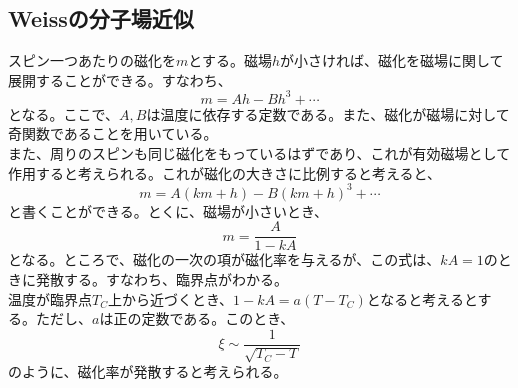 \documentclass[a4paper,11pt]{jsarticle}
\numberwithin{equation}{section}
\begin{document}
\subsection{Weissの分子場近似}
スピン一つあたりの磁化を$m$とする。磁場$h$が小さければ、磁化を磁場に関して展開することができる。すなわち、
\begin{equation}
    m = Ah -Bh^3 + \cdots
\end{equation}
となる。ここで、$A,B$は温度に依存する定数である。また、磁化が磁場に対して奇関数であることを用いている。\\
また、周りのスピンも同じ磁化をもっているはずであり、これが有効磁場として作用すると考えられる。これが磁化の大きさに比例すると考えると、
\begin{equation}
    m = A(km+h) - B(km+h)^3 + \cdots
\end{equation}
と書くことができる。とくに、磁場が小さいとき、
\begin{equation}
    m = \frac{A}{1-kA}
\end{equation}
となる。ところで、磁化の一次の項が磁化率を与えるが、この式は、$kA =1$のときに発散する。すなわち、臨界点がわかる。\\
温度が臨界点$T_C$上から近づくとき、$1-kA = a(T-T_C)$となると考えるとする。ただし、$a$は正の定数である。このとき、
\begin{equation}
    \xi \sim \frac{1}{\sqrt{T_C-T}}
\end{equation}
のように、磁化率が発散すると考えられる。\\
\end{document}
